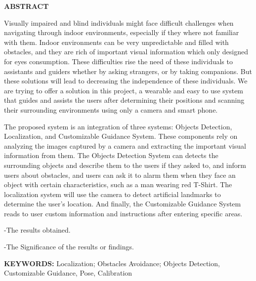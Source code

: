 

\newpage
\thispagestyle{plain}
\setcounter{page}{1}
\renewcommand{\thepage}{\roman{page}}

\begin{center}
    \Large\textbf{ABSTRACT}
\end{center}
\vspace{6pt}

Visually impaired and blind individuals might face difficult challenges when navigating through indoor environments, especially if they where not familiar with them. Indoor environments can be very unpredictable and filled with obstacles, and they are rich of important visual information which only designed for eyes consumption. These difficulties rise the need of these individuals to assistants and guiders whether by asking strangers, or by taking companions. But these solutions will lead to decreasing the independence of these individuals. We are trying to offer a solution in this project, a wearable and easy to use system that guides and assists the users after determining their positions and scanning their surrounding environments using only a camera and smart phone.

The proposed system is an integration of three systems: Objects Detection, Localization, and Customizable Guidance System. These components rely on analyzing the images captured by a camera and extracting the important visual information from them. The Objects Detection System can detects the surrounding objects and describe them to the users if they asked to, and inform users about obstacles, and users can ask it to alarm them when they face an object with certain characteristics, such as a man wearing red T-Shirt. The localization system will use the camera to detect artificial landmarks to determine the user's location. And finally, the Customizable Guidance System reads to user custom information and instructions after entering specific areas.

\color{red}
-The results obtained.

-The Significance of the results or findings.
\color{black}

\vspace{18pt}
\noindent
\textbf{KEYWORDS:} Localization; Obstacles Avoidance; Objects Detection, Customizable Guidance, Pose, Calibration
\vspace{3\baselineskip}